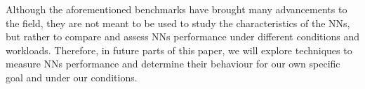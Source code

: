 Although the aforementioned benchmarks have brought many advancements to the field, they are not meant to be used to study the characteristics of the NNs, but rather to compare and assess NNs performance under different conditions and workloads. Therefore, in future parts of this paper, we will explore techniques to measure NNs performance and determine their behaviour for our own specific goal and under our conditions.  










